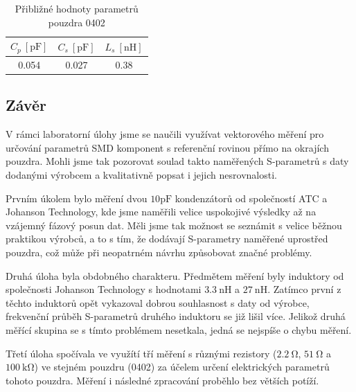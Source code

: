 \documentclass[11pt,a4paper]{article}
\newcommand{\Ohm}{\mathrm{\Omega}}
\newcommand{\kOhm}{\mathrm{k\Omega}}
\begin{document}
\begin{table}[!ht]
    \centering
    \begin{tabular}{|c|c|c|}
        \hline
        $C_p\ [\mathrm{pF}]$ & $C_s\ [\mathrm{pF}]$ & $L_s\ [\mathrm{nH}]$\\
        \hline\hline
        0.054 & 0.027 & 0.38\\
        \hline
    \end{tabular}
    \caption{\label{table:parametry-pouzdra}Přibližné hodnoty parametrů pouzdra 0402}
\end{table}

\subsection*{Závěr}
V rámci laboratorní úlohy jsme se naučili využívat vektorového měření pro určování parametrů SMD komponent s referenční rovinou přímo na okrajích pouzdra. Mohli jsme tak pozorovat soulad takto naměřených S-parametrů s daty dodanými výrobcem a kvalitativně popsat i jejich nesrovnalosti.

Prvním úkolem bylo měření dvou $10\mathrm{pF}$ kondenzátorů od společností ATC a Johanson Technology, kde jsme naměřili velice uspokojivé výsledky až na vzájemný fázový posun dat. Měli jsme tak možnost se seznámit s velice běžnou praktikou výrobců, a to s tím, že dodávají S-parametry naměřené uprostřed pouzdra, což může při neopatrném návrhu způsobovat značné problémy.

Druhá úloha byla obdobného charakteru. Předmětem měření byly induktory od společnosti Johanson Technology s hodnotami $3.3\ \mathrm{nH}$ a $27\ \mathrm{nH}$. Zatímco první z těchto induktorů opět vykazoval dobrou souhlasnost s daty od výrobce, frekvenční průběh S-parametrů druhého induktoru se již lišil více. Jelikož druhá měřící skupina se s tímto problémem nesetkala, jedná se nejspíše o chybu měření.

Třetí úloha spočívala ve využítí tří měření s různými rezistory ($2.2\ \Ohm$, $51\ \Ohm$ a $100\ \kOhm$) ve stejném pouzdru (0402) za účelem určení elektrických parametrů tohoto pouzdra. Měření i následné zpracování proběhlo bez větších potíží.
\end{document}
